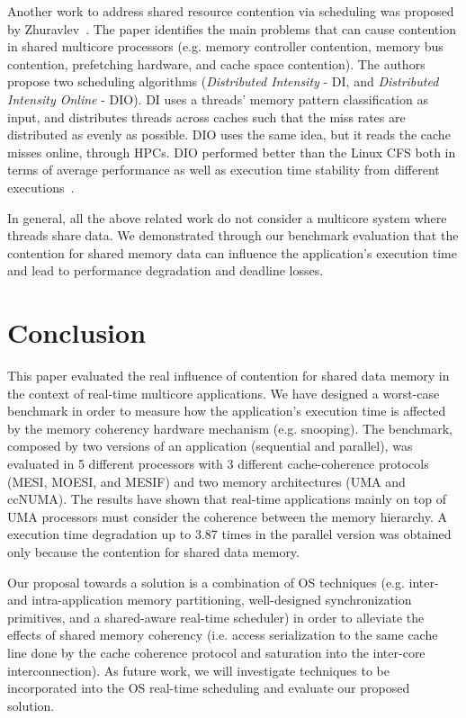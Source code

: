 \documentclass[conference]{IEEEtran}
\begin{document}
Another work to address shared resource contention via scheduling was proposed by Zhuravlev~\cite{Zhuravlev:2010}. The paper identifies the main problems that can cause contention in shared multicore processors (e.g. memory controller contention, memory bus contention, prefetching hardware, and cache space contention). The authors propose two scheduling algorithms (\textit{Distributed Intensity} - DI, and \textit{Distributed Intensity Online} - DIO). DI uses a threads' memory pattern classification as input, and distributes threads across caches such that the miss rates are distributed as evenly as possible. DIO uses the same idea, but it reads the cache misses online, through HPCs. DIO performed better than the Linux CFS both in terms of average performance as well as execution time stability from different executions~\cite{Zhuravlev:2010}.

In general, all the above related work do not consider a multicore system where threads share data. We demonstrated through our benchmark evaluation that the contention for shared memory data can influence the application's execution time and lead to performance degradation and deadline losses. 

\section{Conclusion}
\label{sec:conc}

This paper evaluated the real influence of contention for shared data memory in the context of real-time multicore applications. We have designed a worst-case benchmark in order to measure how the application's execution time is affected by the memory coherency hardware mechanism (e.g. snooping). The benchmark, composed by two versions of an application (sequential and parallel), was evaluated in 5 different processors with 3 different cache-coherence protocols (MESI, MOESI, and MESIF) and two memory architectures (UMA and ccNUMA). The results have shown that real-time applications mainly on top of UMA processors must consider the coherence between the memory hierarchy. A execution time degradation up to 3.87 times in the parallel version was obtained only because the contention for shared data memory.

Our proposal towards a solution is a combination of OS techniques (e.g. inter- and intra-application memory partitioning, well-designed synchronization primitives, and a shared-aware real-time scheduler) in order to alleviate the effects of shared memory coherency (i.e. access serialization to the same cache line done by the cache coherence protocol and saturation into the inter-core interconnection). As future work, we will investigate techniques to be incorporated into the OS real-time scheduling and evaluate our proposed solution.
\end{document}
